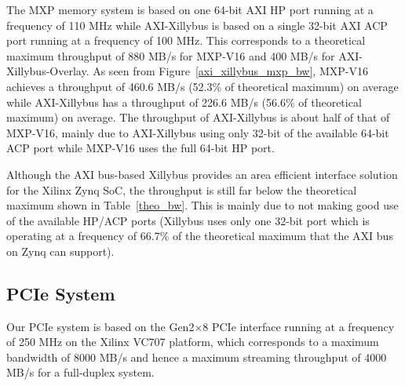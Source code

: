 

The MXP memory system is based on one 64-bit AXI HP port running at a frequency of 110 MHz while AXI-Xillybus is based on a single 32-bit AXI ACP port running at a frequency of 100 MHz. 
This corresponds to a theoretical maximum throughput of 880 MB/s for MXP-V16 and 400 MB/s for AXI-Xillybus-Overlay. 
As seen from Figure~\ref{axi_xillybus_mxp_bw}, MXP-V16 achieves a throughput of 460.6 MB/s (52.3\% of theoretical maximum) on average while AXI-Xillybus has a throughput of 226.6 MB/s (56.6\% of theoretical maximum) on average. 
The throughput of AXI-Xillybus is about half of that of MXP-V16, mainly due to AXI-Xillybus using only 32-bit of the available 64-bit ACP port while MXP-V16 uses the full 64-bit HP port. 


\begin{table}[tb]
	\caption{Area overhead of AXI bus-based systems.}
	\label{xillybus_mxp_area}
	\centering
\end{table}

Although the AXI bus-based Xillybus provides an area efficient interface solution for the Xilinx Zynq SoC, the throughput is still far below the theoretical maximum shown in Table~\ref{theo_bw}. 
This is mainly due to not making good use of the available HP/ACP ports (Xillybus uses only one 32-bit port which is operating at a frequency of 66.7\% of the theoretical maximum that the AXI bus on Zynq can support). 


\subsection{PCIe System}
Our PCIe system is based on the Gen2$\times$8 PCIe interface running at a frequency of 250 MHz on the Xilinx VC707 platform, which corresponds to a maximum bandwidth of 8000 MB/s and hence a maximum streaming throughput of 4000 MB/s for a full-duplex system. 


